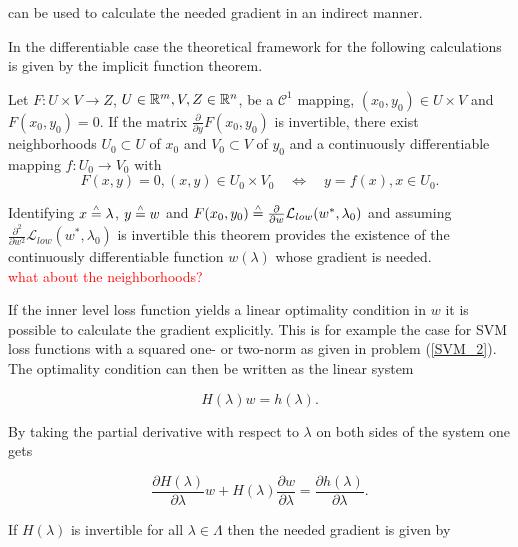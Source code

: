 can be used to calculate the needed gradient in an indirect manner.

In the differentiable case the theoretical framework for the following calculations is given by the implicit function theorem.

\begin{theorem}
	Let \(F: U \times V \to Z \), \(U\in\mathbb{R}^m, V,Z\in \mathbb{R}^n \), be a \(\mathcal{C}^1\) mapping, \((x_0,y_0) \in U\times V\)  and \(F(x_0,y_0) = 0\). If the matrix \(\frac{\partial}{\partial y}F(x_0,y_0)\) is invertible, there exist neighborhoods \(U_0\subset U\) of \(x_0\) and \(V_0\subset V\) of \(y_0\) and a continuously differentiable mapping \(f:U_0 \to V_0\) with 
	\begin{equation*}
	F(x,y) = 0, (x,y)\in U_0\times V_0  \quad \Leftrightarrow \quad y = f(x), x\in U_0.
	\end{equation*}
\end{theorem}

Identifying \(x \overset{\scriptscriptstyle\wedge}{=} \lambda\), \(y \overset{\scriptscriptstyle\wedge}{=} w\) and  \(F(x_0,y_0) \overset{\scriptscriptstyle\wedge}{=} \frac{\partial}{\partial w} \mathcal{L}_{low}(w^*,\lambda_0)\) and assuming \(\frac{\partial^2 }{\partial  w^2}\mathcal{L}_{low}(w^*,\lambda_0)\) is invertible this theorem provides the existence of the continuously differentiable function \(w(\lambda)\) whose gradient is needed. \\
\textcolor{red}{what about the neighborhoods?}

If the inner level loss function yields a linear optimality condition in \(w\) it is possible to calculate the gradient explicitly. This is for example the case for SVM loss functions with a squared one- or two-norm as given in problem (\ref{SVM_2}).
The optimality condition can then be written as the linear system

\begin{equation*}
	H(\lambda)w = h(\lambda).
\end{equation*}

By taking the partial derivative with respect to \(\lambda\) on both sides of the system one gets

\begin{equation*}
	\frac{\partial H(\lambda)}{\partial \lambda}w+H(\lambda)\frac{\partial w}{\partial \lambda} = \frac{\partial h(\lambda)}{\partial  \lambda}.
\end{equation*}

If \(H(\lambda)\) is invertible for all \(\lambda \in \Lambda\) then the needed gradient is given by 


